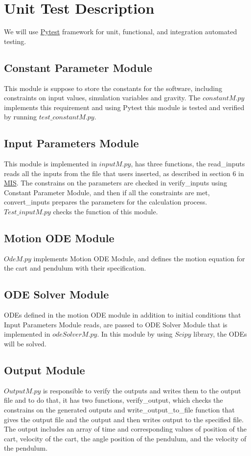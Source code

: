 \documentclass[12pt, titlepage]{article}
\begin{document}
\section{Unit Test Description\label{unittest}}


We will use \href{https://docs.pytest.org/en/7.2.x/}{Pytest} framework for unit, functional, and integration automated testing.
\subsection{Constant Parameter Module}
This module is suppose to store the constants for the software, including constraints on input values, simulation variables and gravity. The $constantM.py$ implements this requirement and using Pytest this module is tested and verified by running $test\_constantM.py$.\\
\subsection{Input Parameters Module}
This module is implemented in $inputM.py$, has three functions, the read\_inputs reads all the inputs from the file that users inserted, as described in section 6 in \href{https://github.com/MinMah23/CAS741-Project/tree/main/docs/Design/SoftDetailedDes}{MIS}. The constrains on the parameters are checked in verify\_inputs using Constant Parameter Module, and then if all the constraints are met, convert\_inputs prepares the parameters for the calculation process. $Test\_inputM.py$ checks the function of this module.\\
\subsection{Motion ODE Module}
$OdeM.py$ implements Motion ODE Module, and defines the motion equation for the cart and pendulum with their specification.\\
 
\subsection{ODE Solver Module}
ODEs defined in the motion ODE module in addition to initial conditions that Input Parameters Module reads, are passed to ODE Solver Module that is implemented in $odeSolverM.py$. In this module by using $Scipy$ library, the ODEs will be solved.\\
\subsection{Output Module}
$OutputM.py$ is responsible to verify the outputs and writes them to the output file and to do that, it has two functions, verify\_output, which checks the constrains on the generated outputs and write\_output\_to\_file function that gives the output file and the output and then writes output to the specified file.
 The output includes an array of time and corresponding values of position of the cart, velocity of the cart, the angle position of the pendulum, and the velocity of the pendulum.\\
\end{document}
